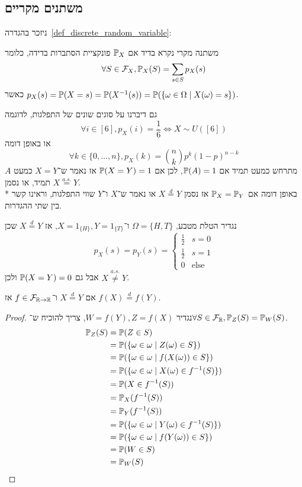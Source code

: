 \subsection{משתנים מקריים}
ניזכר בהגדרה\ \ref{def_discrete_random_variable}:
\begin{definition*}
	משתנה מקרי נקרא בדיד אם $\mathbb{P}_X$ פונקציית הסתברות בדידה, כלומר
	\[
		\forall S \in \mathcal{F}_X, \mathbb{P}_X(S) = \sum_{s \in S} p_X(s)
	\]
	כאשר $p_X(s) = \mathbb{P}(X = s) = \mathbb{P}(X^{-1}(s)) = \mathbb{P}(\{\omega \in \Omega \mid X(\omega) = s \})$.
\end{definition*}
גם דיברנו על סוגים שונים של התפלגות, לדוגמה
\[
	\forall i \in [6], p_X(i) = \frac{1}{6} \iff X \sim U([6])
\]
או באופן דומה
\[
	\forall k \in \{0, \dots, n\}, p_X(k) = \binom{n}{k} p^k {(1 - p)}^{n - k}
\]
$A$ מתרחש כמעט תמיד אם $\mathbb{P}(A) = 1$, לכן אם $\mathbb{P}(X = Y) = 1$ אז נאמר ש־$X = Y$ כמעט תמיד, או נסמן $X \overset{a.s.}{=} Y$. \\*
באופן דומה אם $\mathbb{P}_X = \mathbb{P}_Y$ אז נסמן $X \overset{d}{=} Y$ או נאמר ש־$X$ ו־$Y$ שווי התפלגות, וראינו קשר בין שתי ההגדרות.
\begin{example}
	נגדיר הטלת מטבע, $\Omega = \{H, T\}$ ו־$X = 1_{\{H\}}, Y = 1_{\{T\}}$, אז $X \overset{d}{=} Y$ שכן
	\[
		p_X(s) = p_Y(s) = \begin{cases}
			\frac{1}{2} & s = 0 \\
			\frac{1}{2} & s = 1 \\
			0 & \text{else}
		\end{cases}
	\]
	אבל גם $\mathbb{P}(X = Y) = 0$ ולכן $X \overset{a.s.}{\ne} Y$.
\end{example}
\begin{proposition}
	אם $X \overset{d}{=} Y$ ו־$f \in \mathcal{F}_{\mathbb{R} \to \mathbb{R}}$ אז $f(X) \overset{d}{=} f(Y)$.
\end{proposition}
\begin{proof}
	נגדיר $W = f(Y), Z = f(X)$,
	צריך להוכיח ש־$\forall S \in \mathcal{F}_{\mathbb{R}}, \mathbb{P}_Z(S) = \mathbb{P}_W(S)$.
	\begin{align*}
		\mathbb{P}_Z(S)
		& = \mathbb{P}(Z \in S) \\
		& = \mathbb{P}(\{\omega \in \omega \mid Z(\omega) \in S\}) \\
		& = \mathbb{P}(\{\omega \in \omega \mid f(X(\omega)) \in S\}) \\
		& = \mathbb{P}(\{\omega \in \omega \mid X(\omega) \in f^{-1}(S)\}) \\
		& = \mathbb{P}(X \in f^{-1}(S)) \\
		& = \mathbb{P}_X(f^{-1}(S)) \\
		& = \mathbb{P}_Y(f^{-1}(S)) \\
		& = \mathbb{P}(\{\omega \in \omega \mid Y(\omega) \in f^{-1}(S)\}) \\
		& = \mathbb{P}(\{\omega \in \omega \mid f(Y(\omega)) \in S\}) \\
		& = \mathbb{P}(W \in S) \\
		& = \mathbb{P}_W(S)
	\end{align*}
\end{proof}
